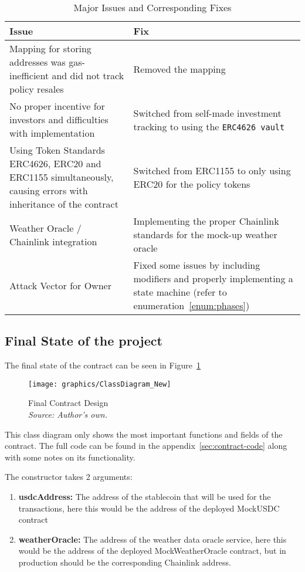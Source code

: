 \documentclass[11pt,a4paper]{article}
\begin{document}
		\begin{table}[h]
			\centering
			\caption{Major Issues and Corresponding Fixes}
			\label{tab:issues-fixes}
			\begin{tabular}{|p{0.42\textwidth}|p{}|}
				\hline
				\textbf{Issue} & \textbf{Fix} \\
				\hline
				Mapping for storing addresses was gas-inefficient and did not track policy resales & Removed the mapping \\
				\hline
				No proper incentive for investors and difficulties with implementation & Switched from self-made investment tracking to using the \texttt{ERC4626 vault} \\
				\hline
				Using Token Standards ERC4626, ERC20 and ERC1155 simultaneously, causing errors with inheritance of the contract & Switched from ERC1155 to only using ERC20 for the policy tokens \\
				\hline
				Weather Oracle / Chainlink integration & Implementing the proper Chainlink standards for the mock-up weather oracle~\parencite{AggregatorV3Interface} \\
				\hline
				Attack Vector for Owner & Fixed some issues by including modifiers and properly implementing a state machine (refer to enumeration~\ref{enum:phases}) \\
				\hline
			\end{tabular}
		\end{table}

        \pagebreak

		\subsection{Final State of the project}\label{subsec:final-state}

		The final state of the contract can be seen in Figure~\ref{fig:final-contract-design}
		\begin{figure}[h]
			\centering
			\texttt{[image: graphics/ClassDiagram\_New]}
			\caption{Final Contract Design \\ \textit{Source: Author's own.}}
			\label{fig:final-contract-design}
		\end{figure}

		This class diagram only shows the most important functions and fields of the contract.
		The full code can be found in the appendix~\ref{sec:contract-code} along with some notes on its functionality.

		The constructor takes 2 arguments:
		\begin{enumerate}[(1)]
			\item \textbf{usdcAddress:} The address of the stablecoin that will be used for the transactions, here this would be the address of the deployed MockUSDC contract
			\item \textbf{weatherOracle:} The address of the weather data oracle service, here this would be the address of the deployed MockWeatherOracle contract, but in production should be the corresponding Chainlink address.
		\end{enumerate}
\end{document}
